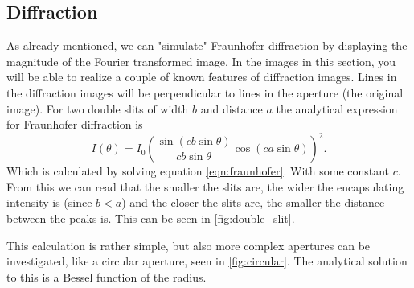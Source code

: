 \subsection{Diffraction}
As already mentioned, we can
"simulate" Fraunhofer diffraction by displaying the magnitude of the Fourier transformed image.
In the images in this section, you will be able to realize a couple of known features
of diffraction images.
Lines in the diffraction images will be perpendicular to lines in the aperture (the original image).
For two double slits of width $b$ and distance $a$ the analytical expression for Fraunhofer diffraction
is
\begin{equation*}
    I(\theta) = I_0 \left(\frac{\sin(c b \sin\theta)}{c b \sin\theta} \cos(c a \sin\theta)\right)^2.
\end{equation*}
Which is calculated by solving equation \eqref{eqn:fraunhofer}.
With some constant $c$. From this we can read that the smaller the slits are, the wider the
encapsulating intensity is (since $b < a$) and the closer the slits are, the smaller the distance between
the peaks is. This can be seen in \autoref{fig:double_slit}.

This calculation is rather simple, but also more complex apertures can be investigated, like a circular
aperture, seen in \autoref{fig:circular}. The analytical solution to this is a Bessel function of the radius.

